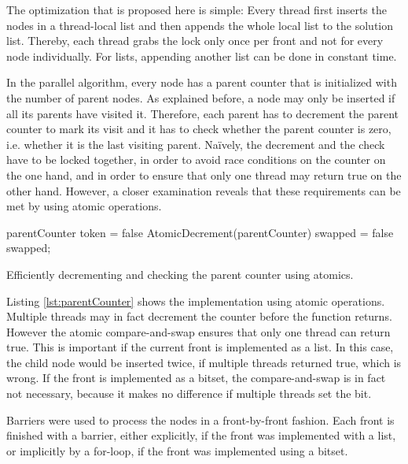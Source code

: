 The optimization that is proposed here is simple: Every thread first inserts the nodes in a thread-local list and then appends the whole local list to the solution list.
Thereby, each thread grabs the lock only once per front and not for every node individually.
For lists, appending another list can be done in constant time.

In the parallel algorithm, every node has a parent counter that is initialized with the number of parent nodes.
As explained before, a node may only be inserted if all its parents have visited it.
Therefore, each parent has to decrement the parent counter to mark its visit and it has to check whether the parent counter is zero, i.e. whether it is the last visiting parent.
Na{\"i}vely, the decrement and the check have to be locked together, in order to avoid race conditions on the counter on the one hand, and in order to ensure that only one thread may return true on the other hand. 
However, a closer examination reveals that these requirements can be met by using atomic operations.

\begin{listing}
  \KwInt parentCounter\;
  \KwBool token = false\;
   {
    AtomicDecrement(parentCounter)\;
    \KwBool swapped = false\;
    \KwRet swapped;
  }
 \caption{Efficiently decrementing and checking the parent counter using atomics.}
 \label{lst:parentCounter}
\end{listing}

Listing \ref{lst:parentCounter} shows the implementation using atomic operations. Multiple threads may in fact decrement the counter before the function returns.
However the atomic compare-and-swap ensures that only one thread can return true. This is important if the current front is implemented as a list.
In this case, the child node would be inserted twice, if multiple threads returned true, which is wrong.
If the front is implemented as a bitset, the compare-and-swap is in fact not necessary, because it makes no difference if multiple threads set the bit.

Barriers were used to process the nodes in a front-by-front fashion.
Each front is finished with a barrier, either explicitly, if the front was implemented with a list, or implicitly by a for-loop, if the front was implemented using a bitset.

